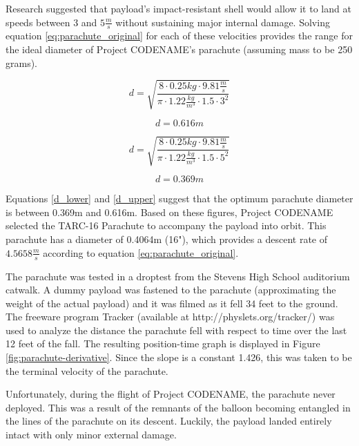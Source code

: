\documentclass[english]{report}
\begin{document}
Research\cite{3to5} suggested that payload's impact-resistant shell would allow it to land at speeds between 3\si{} and $5\si{\frac{m}{s}}$ without sustaining major internal damage.  Solving equation \ref{eq:parachute_original} for each of these velocities provides the range for the ideal diameter of Project CODENAME's parachute (assuming mass to be 250 grams).

\begin{equation}
d = \sqrt{\frac{8\cdot 0.25\si{kg} \cdot 9.81\si{\frac{m}{s}}}{\pi \cdot 1.22\si{\frac{kg}{m^3}}\cdot1.5 \cdot 3^2}}
\end{equation}

\begin{equation}
d = 0.616\si{m}
\label{d_upper}
\end{equation}


\begin{equation}
d = \sqrt{\frac{8\cdot 0.25\si{kg} \cdot 9.81\si{\frac{m}{s}}}{\pi \cdot 1.22\si{\frac{kg}{m^3}}\cdot1.5 \cdot 5^2}}
\end{equation}

\begin{equation}
d = 0.369\si{m}
\label{d_lower}
\end{equation}

  Equations \ref{d_lower} and \ref{d_upper} suggest that the optimum parachute diameter is between 0.369m and 0.616m. Based on these figures, Project CODENAME selected the TARC-16 Parachute to accompany the payload into orbit.  This parachute has a diameter of 0.4064m (16"), which provides a descent rate of $4.5658\si{\frac{m}{s}}$ according to equation
\ref{eq:parachute_original}.

The parachute was tested in a droptest from the Stevens High School auditorium catwalk.  A dummy payload was fastened to the parachute (approximating the weight of the actual payload) and it was filmed as it fell 34 feet to the ground.  The freeware program Tracker (available at http://physlets.org/tracker/) was used to analyze the distance the parachute fell with respect to time over the last 12 feet of the fall.  The resulting position-time graph is displayed in Figure \ref{fig:parachute-derivative}.  Since the slope is a constant 1.426\si{}, this was taken to be the terminal velocity of the parachute. %

Unfortunately, during the flight of Project CODENAME, the parachute never deployed.  This was a result of the remnants of the balloon becoming entangled in the lines of the parachute on its descent.  Luckily, the payload landed entirely intact with only minor external damage.
\end{document}
